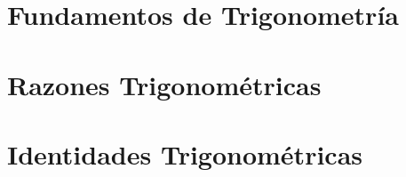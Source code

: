 \documentclass[12pt, a4paper, twoside]{book}
\begin{document}



\chapter{Fundamentos de Trigonometría}

% 
% 
% 

% 
% 
% 



% 
% 
% 

% 
 
 

\chapter{Razones Trigonométricas}

% 
% 
% 

% 
% 
% 

% 
% 
% 

% 
% 
% 

\chapter{Identidades Trigonométricas}
\end{document}
